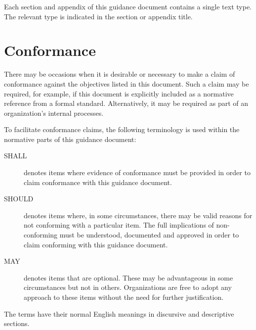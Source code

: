 Each section and appendix of this guidance document contains a single text type. The relevant type is indicated in the section or appendix title.

\section{Conformance}
There may be occasions when it is desirable or necessary to make a claim of conformance against the objectives listed in this document. Such a claim may be required, for example, if this document is explicitly included as a normative reference from a formal standard. Alternatively, it may be required as part of an organization's internal processes.

To facilitate conformance claims, the following terminology is used within the normative parts of this guidance document:
\begin{description}
	\item[SHALL] denotes items where evidence of conformance must be provided in order to claim conformance with this guidance document.
	\item[SHOULD] denotes items where, in some circumstances, there may be valid reasons for not conforming with a particular item. The full implications of non-conforming must be understood, documented and approved in order to claim conforming with this guidance document.
	\item[MAY] denotes items that are optional. These may be advantageous in some circumstances but not in others. Organizations are free to adopt any approach to these items without the need for further justification.
\end{description}

The terms have their normal English meanings in discursive and descriptive sections.
